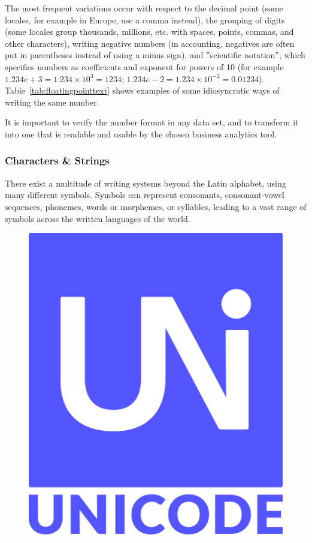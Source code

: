 The most frequent variations occur with respect to the decimal point (some locales, for example in Europe, use a comma instead), the grouping of digits (some locales group thousands, millions, etc. with spaces, points, commas, and other characters), writing negative numbers (in accounting, negatives are often put in parentheses instead of using a minus sign), and ''scientific notation'', which specifies numbers as coefficients and exponent for powers of 10 (for example $1.234e+3 = 1.234 \times 10^3 = 1234$; $1.234e-2 = 1.234 \times 10^{-2} = 0.01234$). Table~\ref{tab:floatingpointtext} shows examples of some idiosyncratic ways of writing the same number. 

\begin{tcolorbox}[colback=alert]
It is important to verify the number format in any data set, and to transform it into one that is readable and usable by the chosen business analytics tool. 
\end{tcolorbox}

\subsubsection*{Characters \& Strings}

There exist a multitude of writing systems beyond the Latin alphabet, using many different symbols. Symbols can represent consonants, consonant-vowel sequences, phonemes, words or morphemes, or syllables, leading to a vast range of symbols across the written languages of the world. 

\begin{figure}
\begin{center}
\includegraphics[height=.5in]{unicode.png}
\end{center}
\end{figure}

